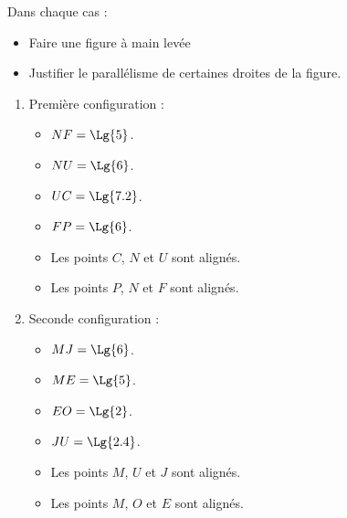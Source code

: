 \begin{exercice*}
    Dans chaque cas :
    \begin{itemize}
        \item Faire une figure à main levée
        \item Justifier le parallélisme de certaines droites de la figure.
    \end{itemize}

    \begin{enumerate}
        \item Première configuration :
        \begin{itemize}
            \item $NF=\Lg{5}$.
            \item $NU=\Lg{6}$.
            \item $UC=\Lg{7.2}$.
            \item $FP=\Lg{6}$.
            \item Les points $C$, $N$ et $U$ sont alignés.
            \item Les points $P$, $N$ et $F$ sont alignés.
        \end{itemize}
        \item Seconde configuration :
        \begin{itemize}
            \item $MJ=\Lg{6}$.
            \item $ME=\Lg{5}$.
            \item $EO=\Lg{2}$.
            \item $JU=\Lg{2.4}$.
            \item Les points $M$, $U$ et $J$ sont alignés.
            \item Les points $M$, $O$ et $E$ sont alignés.
        \end{itemize}

    \end{enumerate}

\end{exercice*}
